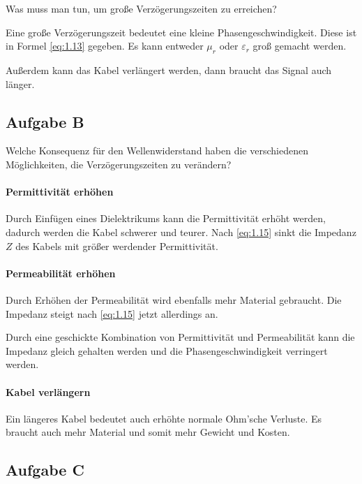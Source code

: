 \begin{problem}
	Was muss man tun, um große Verzögerungszeiten zu erreichen?
\end{problem}

Eine große Verzögerungszeit bedeutet eine kleine Phasengeschwindigkeit. Diese
ist in Formel \eqref{eq:1.13} gegeben. Es kann entweder $\mu_r$ oder
$\varepsilon_r$ groß gemacht werden.

Außerdem kann das Kabel verlängert werden, dann braucht das Signal auch länger.

\subsection{Aufgabe B}

\begin{problem}
	Welche Konsequenz für den Wellenwiderstand haben die verschiedenen
	Möglichkeiten, die Verzögerungszeiten zu verändern?
\end{problem}

\paragraph{Permittivität erhöhen}

Durch Einfügen eines Dielektrikums kann die Permittivität erhöht werden,
dadurch werden die Kabel schwerer und teurer. Nach \eqref{eq:1.15} sinkt die
Impedanz $Z$ des Kabels mit größer werdender Permittivität.

\paragraph{Permeabilität erhöhen}

Durch Erhöhen der Permeabilität wird ebenfalls mehr Material gebraucht. Die
Impedanz steigt nach \eqref{eq:1.15} jetzt allerdings an.

Durch eine geschickte Kombination von Permittivität und Permeabilität kann die
Impedanz gleich gehalten werden und die Phasengeschwindigkeit verringert
werden.

\paragraph{Kabel verlängern}

Ein längeres Kabel bedeutet auch erhöhte normale Ohm'sche Verluste. Es braucht
auch mehr Material und somit mehr Gewicht und Kosten.

\subsection{Aufgabe C}

